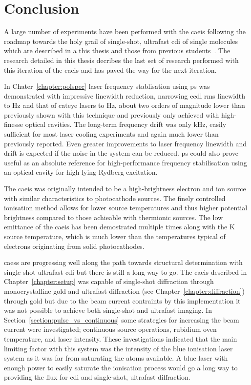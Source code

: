 \chapter{Conclusion}

A large number of experiments have been performed with the \gls{caeis} following the roadmap towards the holy grail of single-shot, ultrafast \gls{cdi} of single molecules which are described in a this thesis and those from previous students~\cite{sheludko_shaped_2010,bell_cold_2011,saliba_cold_2011,mcculloch_generation_2013,taylor_rydberg_2013,tielen_development_2015,murphy_measurement_2017,speirs_electron_2017}.
The research detailed in this thesis decribes the last set of research performed with this iteration of the \gls{caeis} and has paved the way for the next iteration.

In Chater~\ref{chapter:polspec} laser frequency stablisation using \gls{ps} was demonstrated with impressive linewidth reduction, narrowing \gls{ecdl} \gls{rms} linewidth to \unit[600]{Hz} and that of cateye lasers to \unit[360]{Hz}, about two orders of magnitude lower than previously shown with this technique and previously only achieved with high-finesse optical cavities.
The long-term frequency drift was only \unit[51]{kHz}, easily sufficient for most laser cooling experiments and again much lower than previously reported.
Even greater improvements to laser frequency linewidth and drift is expected if the noise in the system can be reduced.
\Gls{ps} could also prove useful as an absolute reference for high-performance frequency stabilisation using an optical cavity for high-lying Rydberg excitation.

The \gls{caeis} was originally intended to be a high-brightness electron and ion source with similar characteristics to photocathode sources.
The finely controlled ionisation method allows for lower source temperatures and thus higher potential brightness compared to those achieable with thermionic sources.
The low emittance of the \gls{caeis} has been demostrated multiple times along with the \unit[10]{K} source temperature, which is much lower than the temperatures typical of electrons originating from solid photocathodes.

\Glspl{caes} are progressing well along the path towards structural determination with single-shot ultrafast \gls{cdi} but there is still a long way to go.
The \gls{caeis} described in Chapter~\ref{chapter:setup} was capable of single-shot diffraction through monocrystalline gold and ultrafast diffraction (see Chapter~\ref{chapter:diffraction}) through gold but due to the beam current contraints by this implementation it was not possible to achieve both single-shot and ultrafast imaging.
In Section~\ref{section:pulse_vs_continuous} some strategies for increasing the beam current were investigated; continuous source operations, rubidium oven temperature, and laser intensity.
These investigations indicated that the main limiting factor with this system was the intensity of the blue ionisation laser system as it was far from saturating the atoms available.
A blue laser with enough power to easily saturate the ionisation process would go a long way to providing the flux for \gls{cdi} and single-shot, ultrafast diffraction.

